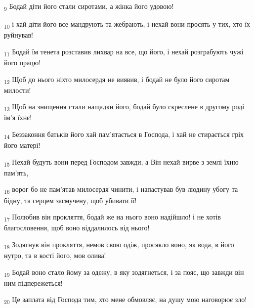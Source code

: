 \begin{tcolorbox}
\textsubscript{9} Бодай діти його стали сиротами, а жінка його удовою!
\end{tcolorbox}
\begin{tcolorbox}
\textsubscript{10} і хай діти його все мандрують та жебрають, і нехай вони просять у тих, хто їх руйнував!
\end{tcolorbox}
\begin{tcolorbox}
\textsubscript{11} Бодай їм тенета розставив лихвар на все, що його, і нехай розграбують чужі його працю!
\end{tcolorbox}
\begin{tcolorbox}
\textsubscript{12} Щоб до нього ніхто милосердя не виявив, і бодай не було його сиротам милости!
\end{tcolorbox}
\begin{tcolorbox}
\textsubscript{13} Щоб на знищення стали нащадки його, бодай було скреслене в другому роді ім'я їхнє!
\end{tcolorbox}
\begin{tcolorbox}
\textsubscript{14} Беззаконня батьків його хай пам'ятається в Господа, і хай не стирається гріх його матері!
\end{tcolorbox}
\begin{tcolorbox}
\textsubscript{15} Нехай будуть вони перед Господом завжди, а Він нехай вирве з землі їхню пам'ять,
\end{tcolorbox}
\begin{tcolorbox}
\textsubscript{16} ворог бо не пам'ятав милосердя чинити, і напастував був людину убогу та бідну, та серцем засмучену, щоб убивати її!
\end{tcolorbox}
\begin{tcolorbox}
\textsubscript{17} Полюбив він прокляття, бодай же на нього воно надійшло! і не хотів благословення, щоб воно віддалилось від нього!
\end{tcolorbox}
\begin{tcolorbox}
\textsubscript{18} Зодягнув він прокляття, немов свою одіж, просякло воно, як вода, в його нутро, та в кості його, мов олива!
\end{tcolorbox}
\begin{tcolorbox}
\textsubscript{19} Бодай воно стало йому за одежу, в яку зодягнеться, і за пояс, що завжди він ним підпережеться!
\end{tcolorbox}
\begin{tcolorbox}
\textsubscript{20} Це заплата від Господа тим, хто мене обмовляє, на душу мою наговорює зло!
\end{tcolorbox}
